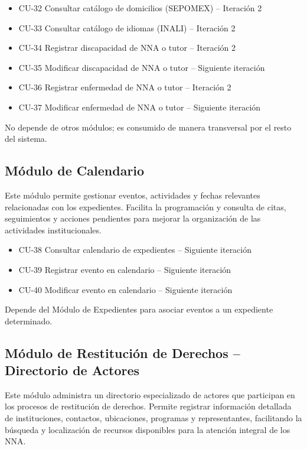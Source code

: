 \begin{itemize}
	\item CU-32 Consultar catálogo de domicilios (SEPOMEX) -- Iteración 2
	\item CU-33 Consultar catálogo de idiomas (INALI) -- Iteración 2
	\item CU-34 Registrar discapacidad de NNA o tutor -- Iteración 2
	\item CU-35 Modificar discapacidad de NNA o tutor -- Siguiente iteración
	\item CU-36 Registrar enfermedad de NNA o tutor -- Iteración 2
	\item CU-37 Modificar enfermedad de NNA o tutor -- Siguiente iteración
\end{itemize}
No depende de otros módulos; es consumido de manera transversal por el resto del sistema.

\subsection*{Módulo de Calendario}
Este módulo permite gestionar eventos, actividades y fechas relevantes relacionadas con los expedientes. Facilita la programación y consulta de citas, seguimientos y acciones pendientes para mejorar la organización de las actividades institucionales.

\begin{itemize}
	\item CU-38 Consultar calendario de expedientes -- Siguiente iteración
	\item CU-39 Registrar evento en calendario -- Siguiente iteración
	\item CU-40 Modificar evento en calendario -- Siguiente iteración
\end{itemize}
Depende del Módulo de Expedientes para asociar eventos a un expediente determinado.

\subsection*{Módulo de Restitución de Derechos -- Directorio de Actores}

Este módulo administra un directorio especializado de actores que participan en los procesos de restitución de derechos. Permite registrar información detallada de instituciones, contactos, ubicaciones, programas y representantes, facilitando la búsqueda y localización de recursos disponibles para la atención integral de los NNA.


